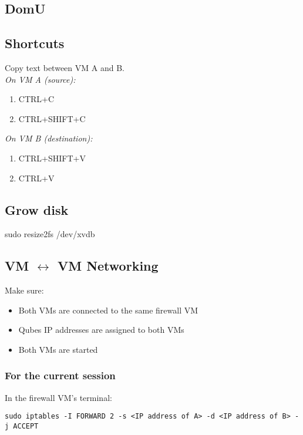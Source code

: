 \documentclass[10pt,a4paper,landscape,twocolumn]{scrartcl}
\begin{document}
\subsection*{DomU}

\subsection*{Shortcuts}
Copy text between VM A and B.\\
\textit{On VM A (source):}
\begin{enumerate}
	\item CTRL+C
	\item CTRL+SHIFT+C
\end{enumerate}
\textit{On VM B (destination):}
\begin{enumerate}
	\item CTRL+SHIFT+V
	\item CTRL+V
\end{enumerate}

\subsection*{Grow disk}
sudo resize2fs /dev/xvdb

\subsection*{VM $\leftrightarrow$ VM Networking}
Make sure:
\begin{itemize}
	\item Both VMs are connected to the same firewall VM
	\item Qubes IP addresses are assigned to both VMs
	\item Both VMs are started
\end{itemize}
\subsubsection*{For the current session}
In the firewall VM's terminal:
\begin{verbatim}
sudo iptables -I FORWARD 2 -s <IP address of A> -d <IP address of B> -j ACCEPT
\end{verbatim}
\end{document}
